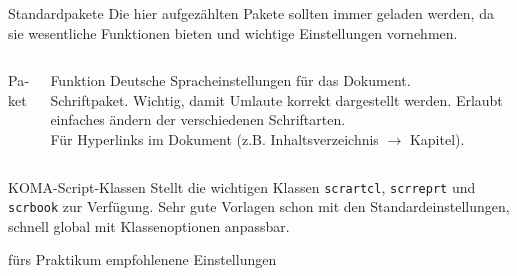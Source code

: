 \begin{frame}[fragile]{Standardpakete}
  Die hier aufgezählten Pakete sollten immer geladen werden, da sie wesentliche Funktionen bieten und wichtige Einstellungen vornehmen.
  \begin{columns}[T]
    \begin{column}{0.47\textwidth}
      \begin{block}{Paket}
        \begin{lstverbatim}
        \usepackage{polyglossia}
        \setmainlanguage{german}
        \usepackage{fontspec}



        \usepackage[unicode, pdfusetitle]{hyperref}
        \end{lstverbatim}
      \end{block}
    \end{column}
    \begin{column}{0.47\textwidth}
      \begin{block}{Funktion}
        Deutsche Spracheinstellungen für das Dokument. \\
        Schriftpaket. Wichtig, damit Umlaute korrekt dargestellt werden.
        Erlaubt einfaches ändern der verschiedenen Schriftarten.\\
        Für Hyperlinks im Dokument (z.B. Inhaltsverzeichnis $\rightarrow$ Kapitel).
      \end{block}
    \end{column}
  \end{columns}
\end{frame}

\begin{frame}[fragile]{
  KOMA-Script-Klassen
  \hfill{}
}
  Stellt die wichtigen Klassen \texttt{scrartcl}, \texttt{scrreprt} und \texttt{scrbook} zur Verfügung.
  Sehr gute Vorlagen schon mit den Standardeinstellungen, schnell global mit Klassenoptionen anpassbar.
  \begin{block}{fürs Praktikum empfohlenene Einstellungen}
  \end{block}
\end{frame}

